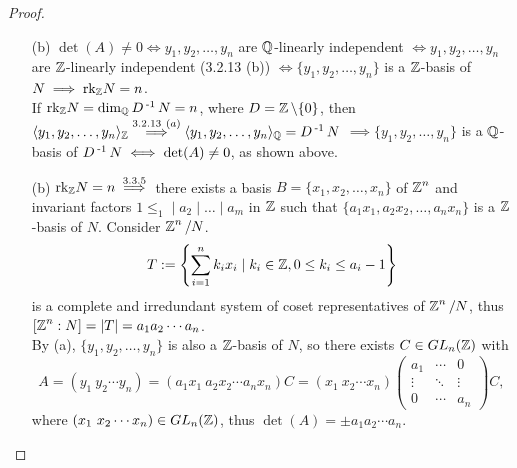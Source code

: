 \documentclass[11pt]{book}
\theoremstyle{definition}   \newtheorem{defn}[counter]{Definition} %
\newcommand{\bs}{\backslash}   \newcommand{\A}{\mathcal{A}}   \newcommand{\sy}{\textnormal{Syl}}   \newcommand{\size}[1]{\left| #1 \right|}
\newcommand{\mymatrix}[2]{\left( \begin{array}{#1} #2 \end{array} \right)}
\newcommand{\gen}[1]{\langle #1 \rangle}   \newcommand{\stab}[2]{\tn{Stab}_{#1}(#2)}   \newcommand{\fix}[2]{\tn{Fix}_{#1}(#2)}   \newcommand{\op}{^{\tn{op}}}
\newcommand{\vs}{\vspace{8pt}}
\numberwithin{counter}{chapter}
\begin{document}
\vs

\begin{proof}\
\begin{enumerate}
\item[(b)] $\det(A) \ne 0 \iff y_1,y_2,\dots,y_n $ are $\operatorname{\mathbb{Q}}$-linearly independent $\iff y_1,y_2,\dots,y_n$ are $\operatorname{\mathbb{Z}}$-linearly independent (3.2.13 (b)) $\iff \{y_1,y_2,\dots,y_n\}$ is a $\operatorname{\mathbb{Z}}$-basis of $N \implies \textnormal{rk}_{\operatorname{\mathbb{Z}}} N = n$. \\

If $\textnormal{rk}_{\operatorname{\mathbb{Z}}} N = \dim_{\operatorname{\mathbb{Q}}} D\operatorname{^{-1}} N = n$, where $D = \z\bs\{0\}$, then $\gen{y_1,y_2,\dots,y_n}_{\z} \overset{3.2.13 \ (a)}{\implies} \gen{y_1,y_2,\dots,y_n}_{\Q} = D\inv N$ $\implies \{y_1,y_2,\dots,y_n\}$ is a $\operatorname{\mathbb{Q}}$-basis of $D\operatorname{^{-1}} N \iff \det (A) \ne 0$, as shown above.
\item[(b)] $\textnormal{rk}_{\operatorname{\mathbb{Z}}} N = n \overset{3.3.5}{\implies}$ there exists a basis $B = \{x_1,x_2,\dots,x_n\}$ of $\operatorname{\mathbb{Z}}^n$ and invariant factors $1 \leq _1 \mid a_2 \mid \dots \mid a_m$ in $\operatorname{\mathbb{Z}}$ such that $\{a_1x_1,a_2x_2,\dots,a_n x_n\}$ is a $\operatorname{\mathbb{Z}}$-basis of $N$. Consider $\operatorname{\mathbb{Z}}^n/N$.
	\[T := \left\{\sum_{i=1}^n k_i x_i \mid k_i \in \operatorname{\mathbb{Z}}, 0 \leq k_i \leq a_i - 1\right\} \]
is a complete and irredundant system of coset representatives of $\operatorname{\mathbb{Z}}^n/N$, thus $[\operatorname{\mathbb{Z}}^n : N] = |T| = a_1 a_2 \cdots a_n$. \\

By (a), $\{y_1,y_2,\dots,y_n\}$ is also a $\operatorname{\mathbb{Z}}$-basis of $N$, so there exists $C \in GL_n(\operatorname{\mathbb{Z}})$ with  \[A = (y_1\ y_2 \cdots y_n) = (a_1x_1 \ a_2 x_2 \cdots a_n x_n) C = (x_1 \ x_2 \cdots x_n) \mymatrix{ccc}{a_1 & \cdots & 0 \\ \vdots & \ddots & \vdots \\ 0 & \cdots & a_n} C, \]
where $(x_1 \ x_2 \cdots x_n) \in GL_n(\operatorname{\mathbb{Z}})$, thus $\det(A) = \pm a_1 a_2 \cdots a_n$.
\end{enumerate}
\end{proof}

\vs
\end{document}
